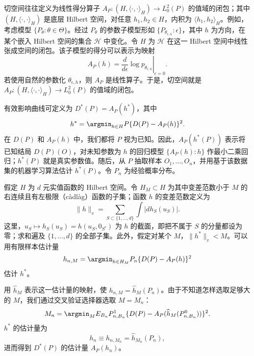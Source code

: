 切空间往往定义为线性得分算子
$A_P:(H,\langle\cdot,\cdot\rangle_H)\to L_0^2(P)$
的值域的闭包；其中 $(H,\langle\cdot,\cdot\rangle_H)$ 是底层 Hilbert 空间，对任意 $h_1,h_2\in H$，内积为 $\langle h_1,h_2\rangle_H$。例如，考虑模型 $\{P_\theta:\theta\in\Theta\}$。经过 $P_\theta$ 的参数子模型形如 $\{P_{\theta_{\epsilon,h}}:\epsilon\}$，其中 $h$ 为方向，在某个嵌入 Hilbert 空间的集合 $\mathcal H$ 中变化。令 $H$ 为 $\mathcal H$ 在这一 Hilbert 空间中线性张成空间的闭包。该子模型的得分可以表示为映射
\[
 A_P(h)=\left.\frac{d}{d\epsilon}\log p_{\theta_{\epsilon,h}}\right|_{\epsilon=0}.
\]
若使用自然的参数化 $\theta_{\epsilon,h}$，则 $A_P$ 是线性算子。于是，切空间就是
$A_P:(H,\langle\cdot,\cdot\rangle_H)\to L_0^2(P)$
的值域的闭包。

有效影响曲线可定义为 $D^*(P)=A_P(h^*)$，其中
\[
 h^*=\argmin_{h\in H}P\{D(P)-A_P(h)\}^2.
\]
在 $D(P)$ 和 $A_P(h)$ 中，我们都将 $P$ 视为已知。因此，$A_P(h^*(P))$ 表示将已知结局 $D(P)(O)$，对未知参数为 $h$ 的回归模型 $\{A_P(h):h\}$ 作最小二乘回归；$h^*(P)$ 就是真实参数值。随后，从 $P$ 抽取样本 $O_1,\ldots,O_n$，并用基于该数据集的机器学习算法估计 $h^*(P)$。令 $P_n$ 为经验概率分布。

假定 $H$ 为 $d$ 元实值函数的 Hilbert 空间。令 $H_M\subset H$ 为其中变差范数小于 $M$ 的右连续且有左极限（càdlàg）函数的子集；函数 $h$ 的变差范数定义为
\[
 \|h\|_v=\sum_{S\subset\{1,\ldots,d\}}\int|dh_S(u_S)|.
\]
这里，$u_S\mapsto h_S(u_S)=h(u_S,0_{S^c})$ 为 $h$ 的截面，即把不属于 $S$ 的分量都设为零；求和遍及 $\{1,\ldots,d\}$ 的全部子集。此外，假定对某个 $M$，$\|h^*\|_v<M$。可以用有限样本估计量
\[
 h_{n,M}=\argmin_{h\in H_M}P_n\{D(P)-A_P(h)\}^2
\]
估计 $h^*$。

用 $\widehat h_M$ 表示这一估计量的映射，使 $h_{n,M}=\widehat h_M(P_n)$。由于不知道怎样选取足够大的 $M$，我们通过交叉验证选择器选取 $M=M_n$：
\[
 M_n=\argmin_M E_{B_n}P_{n,B_n}^1
 \{D(P)-A_P(\widehat h_M(P_{n,B_n}^0))\}^2.
\]
$h^*$ 的估计量为
\[
 h_n\equiv h_{n,M_n}=\widehat h_{M_n}(P_n),
\]
进而得到 $D^*(P)$ 的估计量 $A_P(h_n)$。

